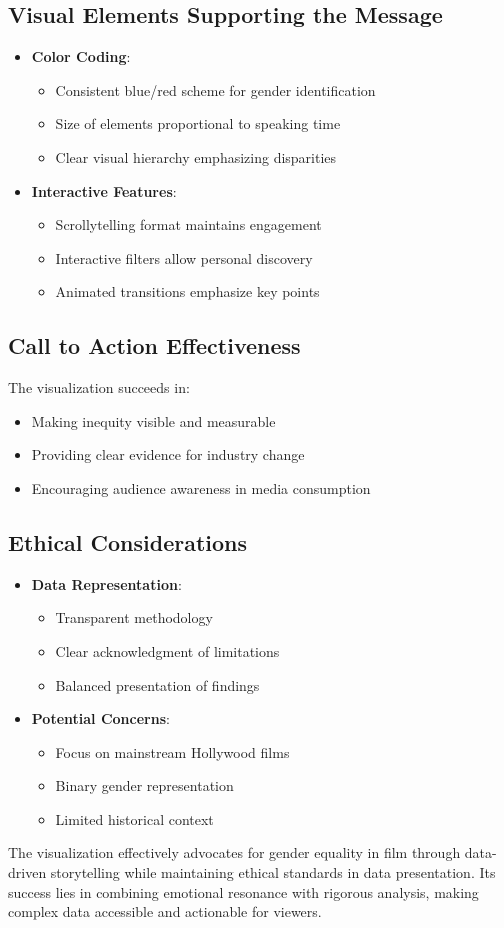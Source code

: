 \documentclass{article}
\begin{document}
\subsection*{Visual Elements Supporting the Message}
\begin{itemize}
    \item \textbf{Color Coding}:
        \begin{itemize}
            \item Consistent blue/red scheme for gender identification
            \item Size of elements proportional to speaking time
            \item Clear visual hierarchy emphasizing disparities
        \end{itemize}
    \item \textbf{Interactive Features}:
        \begin{itemize}
            \item Scrollytelling format maintains engagement
            \item Interactive filters allow personal discovery
            \item Animated transitions emphasize key points
        \end{itemize}
\end{itemize}

\subsection*{Call to Action Effectiveness}
The visualization succeeds in:
\begin{itemize}
    \item Making inequity visible and measurable
    \item Providing clear evidence for industry change
    \item Encouraging audience awareness in media consumption
\end{itemize}

\subsection*{Ethical Considerations}
\begin{itemize}
    \item \textbf{Data Representation}:
        \begin{itemize}
            \item Transparent methodology
            \item Clear acknowledgment of limitations
            \item Balanced presentation of findings
        \end{itemize}
    \item \textbf{Potential Concerns}:
        \begin{itemize}
            \item Focus on mainstream Hollywood films
            \item Binary gender representation
            \item Limited historical context
        \end{itemize}
\end{itemize}

The visualization effectively advocates for gender equality in film through data-driven storytelling while maintaining ethical standards in data presentation. Its success lies in combining emotional resonance with rigorous analysis, making complex data accessible and actionable for viewers.
\end{document}
